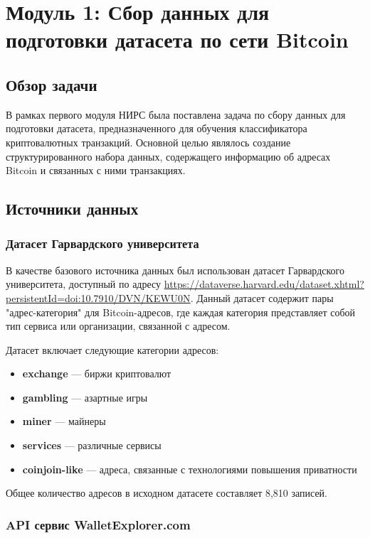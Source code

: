 \section{Модуль 1: Сбор данных для подготовки датасета по сети Bitcoin}

\subsection{Обзор задачи}

В рамках первого модуля НИРС была поставлена задача по сбору данных для подготовки датасета, предназначенного для обучения классификатора криптовалютных транзакций. Основной целью являлось создание структурированного набора данных, содержащего информацию об адресах Bitcoin и связанных с ними транзакциях.

\subsection{Источники данных}

\subsubsection{Датасет Гарвардского университета}

В качестве базового источника данных был использован датасет Гарвардского университета, доступный по адресу \url{https://dataverse.harvard.edu/dataset.xhtml?persistentId=doi:10.7910/DVN/KEWU0N}. Данный датасет содержит пары "адрес-категория" для Bitcoin-адресов, где каждая категория представляет собой тип сервиса или организации, связанной с адресом.

Датасет включает следующие категории адресов:
\begin{itemize}
    \item \textbf{exchange} --- биржи криптовалют
    \item \textbf{gambling} --- азартные игры
    \item \textbf{miner} --- майнеры
    \item \textbf{services} --- различные сервисы
    \item \textbf{coinjoin-like} --- адреса, связанные с технологиями повышения приватности
\end{itemize}

Общее количество адресов в исходном датасете составляет 8,810 записей.

\subsubsection{API сервис WalletExplorer.com}

